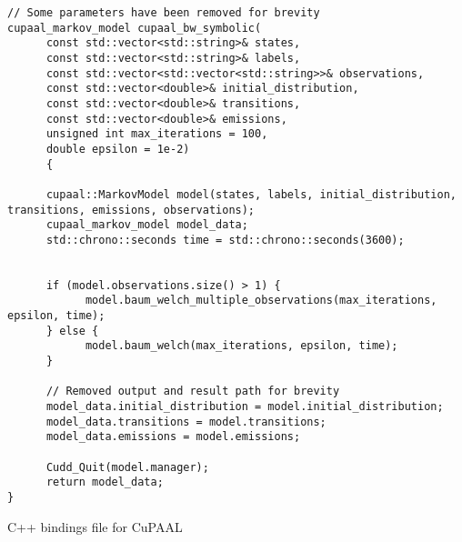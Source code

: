 \begin{listing*}[htb!]
      \begin{verbatim}
// Some parameters have been removed for brevity
cupaal_markov_model cupaal_bw_symbolic(
      const std::vector<std::string>& states,
      const std::vector<std::string>& labels, 
      const std::vector<std::vector<std::string>>& observations, 
      const std::vector<double>& initial_distribution, 
      const std::vector<double>& transitions, 
      const std::vector<double>& emissions, 
      unsigned int max_iterations = 100, 
      double epsilon = 1e-2)
      {

      cupaal::MarkovModel model(states, labels, initial_distribution, transitions, emissions, observations);
      cupaal_markov_model model_data;
      std::chrono::seconds time = std::chrono::seconds(3600);

    
      if (model.observations.size() > 1) {
            model.baum_welch_multiple_observations(max_iterations, epsilon, time);
      } else {
            model.baum_welch(max_iterations, epsilon, time);
      }

      // Removed output and result path for brevity
      model_data.initial_distribution = model.initial_distribution;
      model_data.transitions = model.transitions;
      model_data.emissions = model.emissions;

      Cudd_Quit(model.manager);
      return model_data;
}
      \end{verbatim}
      \caption{C++ bindings file for CuPAAL}
      \label{lst:cupaal-bindings}
\end{listing*}

